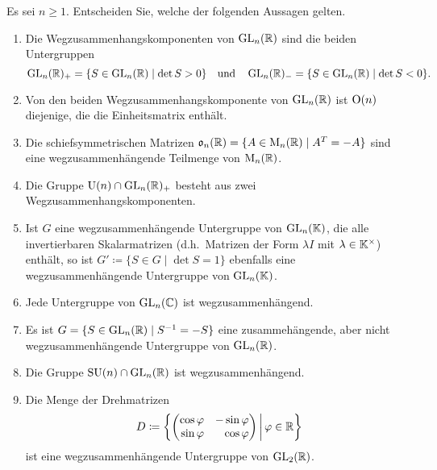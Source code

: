 \begin{question}[subtitle = Multiple Choice zu Wegzusammenhangskomponenten]{1}
  Es sei $n \geq 1$.
  Entscheiden Sie, welche der folgenden Aussagen gelten.
  \begin{enumerate}[leftmargin=*]
    \item
      Die Wegzusammenhangskomponenten von $\operatorname{GL}_n(\mathbb{R})$ sind die beiden Untergruppen
      \[
        \operatorname{GL}_n(\mathbb{R})_+ = \{ S \in \operatorname{GL}_n(\mathbb{R}) \mid \det S > 0 \}
        \quad\text{und}\quad
        \operatorname{GL}_n(\mathbb{R})_- = \{ S \in \operatorname{GL}_n(\mathbb{R}) \mid \det S < 0 \}.
      \]
    \item
      Von den beiden Wegzusammenhangskomponente von $\operatorname{GL}_n(\mathbb{R})$ ist $\operatorname{O}(n)$ diejenige, die die Einheitsmatrix enthält.
    \item
      Die schiefsymmetrischen Matrizen $\mathfrak{o}_n(\mathbb{R}) = \{ A \in \operatorname{M}_n(\mathbb{R}) \mid A^T = -A \}$ sind eine wegzusammenhängende Teilmenge von $\operatorname{M}_n(\mathbb{R})$.
    \item
      Die Gruppe $\operatorname{U}(n) \cap \operatorname{GL}_n(\mathbb{R})_+$ besteht aus zwei Wegzusammenhangskomponenten.
    \item
      Ist $G$ eine wegzusammenhängende Untergruppe von $\operatorname{GL}_n(\mathbb{K})$, die alle invertierbaren Skalarmatrizen (d.h.\ Matrizen der Form $\lambda I$ mit $\lambda \in \mathbb{K}^\times$) enthält, so ist $G' \coloneqq \{ S \in G \mid \det S = 1 \}$ ebenfalls eine wegzusammenhängende Untergruppe von $\operatorname{GL}_n(\mathbb{K})$.
    \item
      Jede Untergruppe von $\operatorname{GL}_n(\mathbb{C})$ ist wegzusammenhängend.
    \item
      Es ist $G = \{ S \in \operatorname{GL}_n(\mathbb{R}) \mid S^{-1} = -S \}$ eine zusammehängende, aber nicht wegzusammenhängende Untergruppe von $\operatorname{GL}_n(\mathbb{R})$.
    \item
      Die Gruppe $\operatorname{SU}(n) \cap \operatorname{GL}_n(\mathbb{R})$ ist wegzusammenhängend.
    \item
      Die Menge der Drehmatrizen
      \[
        D
        \coloneqq
        \left\{
          \begin{pmatrix*}[r]
            \cos \varphi  & -\sin \varphi \\
            \sin \varphi  &  \cos \varphi 
          \end{pmatrix*}
        \,\middle|\,
        \varphi \in \Rbb
        \right\}
      \]
      ist eine wegzusammenhängende Untergruppe von $\operatorname{GL}_2(\mathbb{R})$.
  \end{enumerate}
\end{question}
